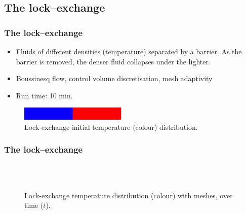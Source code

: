 \subsection{The lock--exchange}

\begin{frame}
    \frametitle{The lock--exchange}
\begin{itemize}
\item Fluids of different densities (temperature) separated by a barrier. As the barrier is removed, the denser fluid
  collapses under the lighter.
\item Boussinesq flow, control volume discretisation, mesh adaptivity
\item Run time: 10 min.
\end{itemize}

\begin{figure}
\centering
\includegraphics[width=0.45\textwidth]{./lock_exchange/le_basic_0_T}
\caption{Lock-exchange initial temperature (colour) distribution.}
\end{figure}

\end{frame}
%
\begin{frame}
    \frametitle{The lock--exchange}
\begin{figure}[ht]
  \centering
   \\
   \\
  \caption{Lock-exchange temperature distribution (colour) with meshes, over time ($t$).}
\end{figure}
\end{frame}
